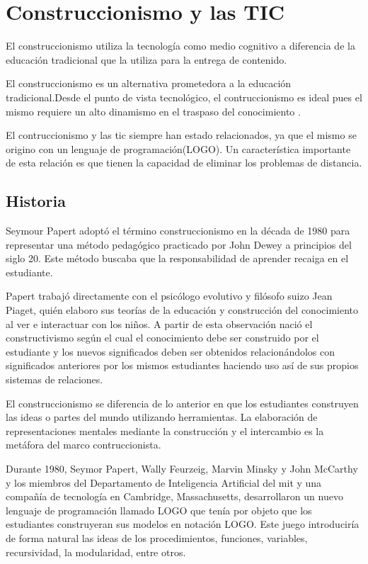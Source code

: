\section{Construccionismo y las TIC}

El construccionismo utiliza la tecnología como medio cognitivo  a diferencia de
la educación tradicional que la utiliza para la entrega de contenido. 

El construccionismo es un alternativa prometedora a la educación
tradicional.Desde el punto de vista tecnológico, el contruccionismo es ideal
pues el mismo requiere un alto dinamismo en el traspaso del conocimiento
\cite{sasha:construtivism}. 

El contruccionismo y las \Gls{tic} siempre han estado relacionados, ya que el
mismo se origino con un lenguaje de programación(LOGO)\cite{ict:ttc}. Un
característica importante de esta relación es que tienen la capacidad de
eliminar los problemas de distancia\cite{mariluz:seiousgames}.


\subsection{Historia}

Seymour Papert adoptó el término construccionismo en la década de 1980 para
representar una método pedagógico practicado por John Dewey a principios del
siglo 20. Este método buscaba que la responsabilidad de aprender recaiga en el
estudiante. 

Papert trabajó directamente con el psicólogo evolutivo y filósofo suizo Jean
Piaget, quién elaboro sus teorías de la educación y construcción del
conocimiento al ver e interactuar con los niños. A partir de esta observación
nació el constructivismo según el cual el conocimiento debe ser construido por
el estudiante y los nuevos significados deben ser obtenidos relacionándolos con
significados anteriores por los mismos estudiantes haciendo uso así de sus
propios sistemas de relaciones.

El construccionismo se diferencia de lo anterior en que los estudiantes
construyen las ideas o partes del mundo utilizando herramientas. La elaboración
de representaciones mentales mediante la construcción y el intercambio es la
metáfora del marco contruccionista. 

Durante 1980, Seymor Papert, Wally Feurzeig, Marvin Minsky y John McCarthy y los
miembros del Departamento de Inteligencia Artificial del \Gls{mit} y una
compañía de tecnología en Cambridge, Massachusetts, desarrollaron un nuevo
lenguaje de programación llamado LOGO que tenía por objeto que los estudiantes
construyeran sus modelos en notación LOGO\@. Este juego introduciría de forma
natural las ideas de los procedimientos, funciones, variables, recursividad, la
modularidad, entre otros.

